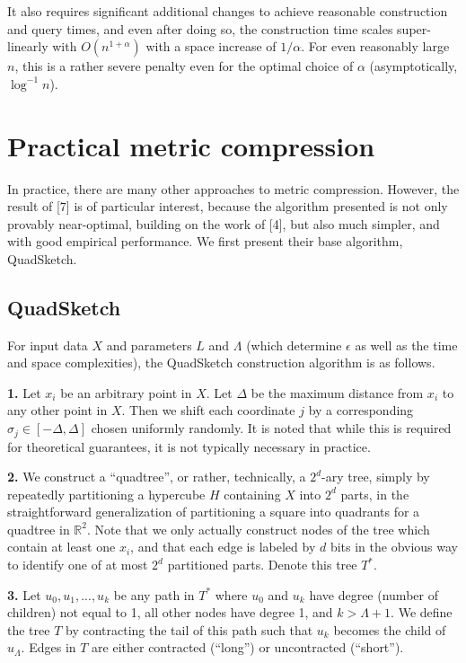 \documentclass{article}
\begin{document}
It also requires significant additional changes to achieve reasonable
construction and query times, and even after doing so, the construction time
scales super-linearly with $O(n^{1 + \alpha})$ with a space increase of $1/\alpha$. For
even reasonably large $n$, this is a rather severe penalty even for the optimal
choice of $\alpha$ (asymptotically, $\log^{-1} n$).

\section{Practical metric compression}

In practice, there are many other approaches to metric compression. However, the
result of [7] is of particular interest, because the algorithm presented is not
only provably near-optimal, building on the work of [4], but also much simpler,
and with good empirical performance. We first present their base algorithm,
QuadSketch.

\subsection{QuadSketch}

For input data $X$ and parameters $L$ and $\Lambda$ (which determine $\epsilon$ as well as
the time and space complexities), the QuadSketch construction algorithm is as
follows.

\textbf{1.} Let $x_i$ be an arbitrary point in $X$. Let $\Delta$ be the maximum
distance from $x_i$ to any other point in $X$. Then we shift each coordinate $j$
by a corresponding $\sigma_j \in [-\Delta, \Delta]$ chosen uniformly randomly. It is noted that
while this is required for theoretical guarantees, it is not typically necessary
in practice.

\textbf{2.} We construct a ``quadtree'', or rather, technically, a $2^d$-ary
tree, simply by repeatedly partitioning a hypercube $H$ containing $X$ into
$2^d$ parts, in the straightforward generalization of partitioning a square into
quadrants for a quadtree in $\mathbb{R}^2$. Note that we only actually construct
nodes of the tree which contain at least one $x_i$, and that each edge is
labeled by $d$ bits in the obvious way to identify one of at most $2^d$
partitioned parts. Denote this tree $T^*$.

\textbf{3.} Let $u_0,u_1,...,u_k$ be any path in $T^*$ where $u_0$ and $u_k$
have degree (number of children) not equal to 1, all other nodes have degree 1,
and $k > \Lambda + 1$. We define the tree $T$ by contracting the tail of this path
such that $u_k$ becomes the child of $u_\Lambda$. Edges in $T$ are either contracted
(``long'') or uncontracted (``short'').
\end{document}
